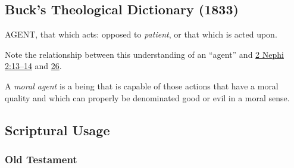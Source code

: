 
	
\subsection{Buck's Theological Dictionary (1833)} %
	\label{AGENCY-BTD}

	\begin{compactdesc}
		\item[26] AGENT, that which acts: opposed to \textit{patient}, or that which is acted upon.\footnotemark
			\begin{compactitem}
				\item Note the relationship between this understanding of an ``agent'' and \hyperref[2NEPHI-2-13]{2 Nephi 2:13--14} and \hyperref[2NEPHI-2-26]{26}.
			\end{compactitem}
		\item[644] A \textit{moral agent} is a being that is capable of those actions that have a moral quality and which can properly be denominated good or evil in a moral sense.
	\end{compactdesc}

\subsection{Scriptural Usage} %
	\label{AGENCY-SCRIPTURES}

	\subsubsection{Old Testament} %
		\label{AGENCY-OT}
	
